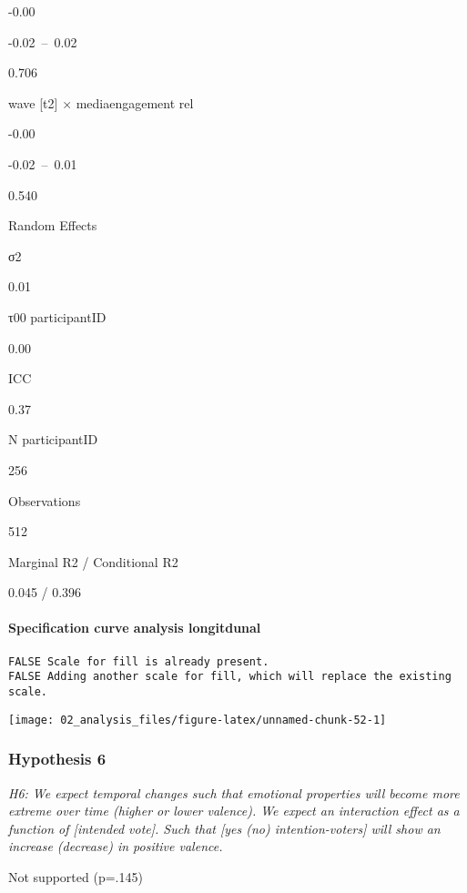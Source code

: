\documentclass[
]{article}
\begin{document}
-0.00

-0.02~--~0.02

0.706

wave {[}t2{]} × mediaengagement rel

-0.00

-0.02~--~0.01

0.540

Random Effects

σ2

0.01

τ00 participantID

0.00

ICC

0.37

N participantID

256

Observations

512

Marginal R2 / Conditional R2

0.045 / 0.396

\hypertarget{specification-curve-analysis-longitdunal}{%
\paragraph{Specification curve analysis
longitdunal}\label{specification-curve-analysis-longitdunal}}

\begin{verbatim}
FALSE Scale for fill is already present.
FALSE Adding another scale for fill, which will replace the existing scale.
\end{verbatim}

\begin{center}\texttt{[image: 02\_analysis\_files/figure-latex/unnamed-chunk-52-1]} \end{center}

\hypertarget{hypothesis-6}{%
\subsubsection{Hypothesis 6}\label{hypothesis-6}}

\emph{H6: We expect temporal changes such that emotional properties will
become more extreme over time (higher or lower valence). We expect an
interaction effect as a function of {[}intended vote{]}. Such that
{[}yes (no) intention-voters{]} will show an increase (decrease) in
positive valence. }

Not supported (p=.145)

~
\end{document}
